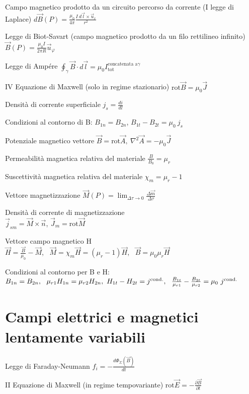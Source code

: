 \documentclass[10pt,a4paper]{article}
\begin{document}
\begin{multicols}{2}
Campo magnetico prodotto da un circuito percorso da corrente (I legge di Laplace) $d\vec{B} (P)=\frac{\mu _{0}}{4\pi }\frac{I\ d\vec{l} \times \vec{u}_{r}}{r^{2}}$

Legge di Biot-Savart (campo magnetico prodotto da un filo rettilineo infinito) $\vec{B} (P)=\frac{\mu _{0} I}{2\pi R}\vec{u}_{\varphi }$

Legge di Ampére $\oint _{\gamma }\vec{B} \cdot d\vec{l} =\mu _{0} I^{\text{concatenata a} \gamma }_{\text{tot}}$

IV Equazione di Maxwell (solo in regime stazionario) $\text{rot}\vec{B} =\mu _{0}\vec{J}$

Densità di corrente superficiale $j_{s} =\frac{di}{dl}$

Condizioni al contorno di B: $B_{1n} =B_{2n}$, $B_{1t} -B_{2t} =\mu _{0} \ j_{s}$

Potenziale magnetico vettore $\vec{B} =\text{rot}\vec{A} ,\ \nabla ^{2}\vec{A} =-\mu _{0}\vec{J}$

Permeabilità magnetica relativa del materiale $\frac{B}{B_{0}} =\mu _{r}$

Suscettività magnetica relativa del materiale $\chi _{m} =\mu _{r} -1$

Vettore magnetizzazione $\vec{M} (P)=\lim _{\Delta \tau \rightarrow 0}\frac{\Delta \vec{m}}{\Delta \tau }$

Densità di corrente di magnetizzazione \\$\vec{j}_{sm} =\vec{M} \times \vec{n}$, $\vec{J}_{m} =\text{rot}\vec{M}$

Vettore campo magnetico H \\$\vec{H} =\frac{\vec{B}}{\mu _{0}} -\vec{M}$, \ $\vec{M} =\chi _{m}\vec{H} =(\mu _{r} -1)\vec{H}$, \ $\vec{B} =\mu _{0} \mu _{r}\vec{H}$

Condizioni al contorno per B e H: \\$B_{1n} =B_{2n} ,\ \ \mu _{r1} H_{1n} =\mu _{r2} H_{2n} ,\\ \ H_{1t} -H_{2t} =j^{\text{cond.}} ,\ \ \frac{B_{1t}}{\mu _{r1}} -\frac{B_{2t}}{\mu _{r2}} =\mu _{0} \ j^{\text{cond.}}$
\section*{Campi elettrici e magnetici lentamente variabili}

Legge di Faraday-Neumann $f_{i} =-\frac{d\Phi _{\Sigma } (\vec{B} )}{dt}$

II Equazione di Maxwell (in regime tempovariante) $\text{rot}\vec{E} =-\frac{\partial \vec{B}}{\partial t}$


\end{multicols}
\end{document}

